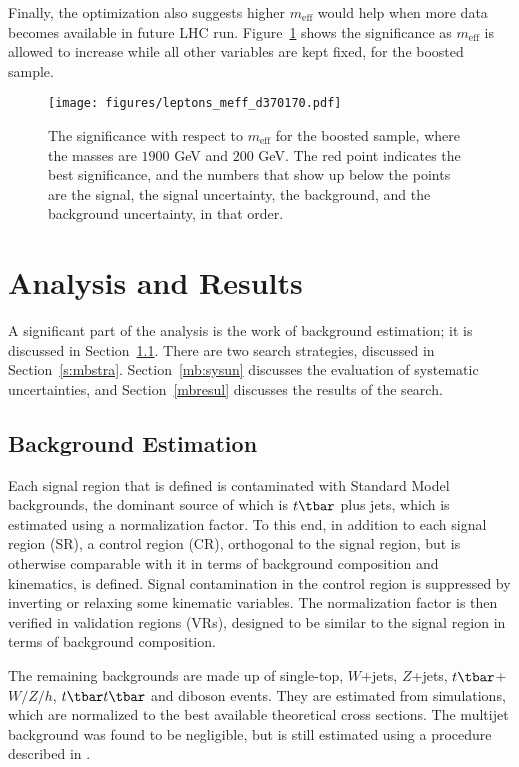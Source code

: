 Finally, the optimization also suggests higher $m_{\text{eff}}$ would help when
more data becomes available in future LHC run. Figure~\ref{f:mbmeffsop} shows
the significance as $m_{\text{eff}}$ is allowed to increase while all other
variables are kept fixed, for the boosted sample.



\begin{figure}[H]
	\texttt{[image: figures/leptons\_meff\_d370170.pdf]}
	\centering

	\caption{The significance with respect to $m_{\text{eff}}$ for the boosted
		sample, where the masses are $1900$ GeV and $200$ GeV. The red point
		indicates the best significance, and the numbers that show up below the
		points are the signal, the signal uncertainty, the background, and the
		background uncertainty, in that order.}

	\label{f:mbmeffsop}
\end{figure}


\section{Analysis and Results}\label{mbbganal}

A significant part of the analysis is the work of background estimation; it is
discussed in Section~\ref{s:mbbg}. There are two search strategies, discussed
in Section~\ref{s:mbstra}. Section~\ref{mb:sysun} discusses the evaluation of
systematic uncertainties, and Section~\ref{mbresul} discusses the results of
the search.

\subsection{Background Estimation}\label{s:mbbg}

Each signal region that is defined is contaminated with Standard Model
backgrounds, the dominant source of which is $t\tbar$ plus jets, which is
estimated using a normalization factor. To this end, in addition to each signal
region (SR), a control region (CR), orthogonal to the signal region, but is
otherwise comparable with it in terms of background composition and kinematics,
is defined. Signal contamination in the control region is suppressed by
inverting or relaxing some kinematic variables. The normalization factor is
then verified in validation regions (VRs), designed to be similar to the signal
region in terms of background composition.

The remaining backgrounds are made up of single-top, $W$+jets, $Z$+jets,
$t\tbar$+$W/Z/h$, $t\tbar t\tbar$ and diboson events. They are estimated from
simulations, which are normalized to the best available theoretical cross
sections. The multijet background was found to be negligible, but is still
estimated using a procedure described in \cite{Aad:2012fqa}.

